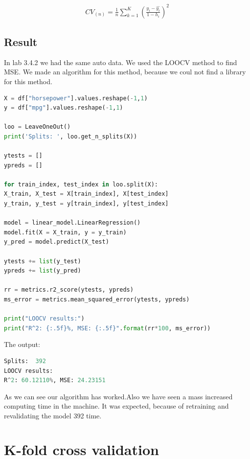 \begin{align}\label{fo:LOOCV}
CV_{(n)} = \frac {1}{n} \sum_{k=1}^{K}  (\frac {y_i-\hat{y_i}}{1- h_i})^2
\end{align}



\subsection{Result}
In lab 3.4.2 we had the same auto data. We used the LOOCV method to find MSE. We made an algorithm for this method, because we coul not find a library for this method.

\begin{lstlisting}[language=Python]
X = df["horsepower"].values.reshape(-1,1)
y = df["mpg"].values.reshape(-1,1) 

loo = LeaveOneOut()
print('Splits: ', loo.get_n_splits(X))

ytests = []
ypreds = []

for train_index, test_index in loo.split(X):
X_train, X_test = X[train_index], X[test_index]
y_train, y_test = y[train_index], y[test_index]

model = linear_model.LinearRegression()
model.fit(X = X_train, y = y_train)
y_pred = model.predict(X_test)

ytests += list(y_test)
ypreds += list(y_pred)

rr = metrics.r2_score(ytests, ypreds)
ms_error = metrics.mean_squared_error(ytests, ypreds)

print("LOOCV results:")
print("R^2: {:.5f}%, MSE: {:.5f}".format(rr*100, ms_error))
\end{lstlisting}

The output:
\begin{lstlisting}[language=Python]
Splits:  392
LOOCV results:
R^2: 60.12110%, MSE: 24.23151
\end{lstlisting}

As we can see our algorithm has worked.Also we have seen a mass increased computing time in the machine. It was expected, because of retraining and revalidating the model 392 time.

\section {K-fold cross validation}%
